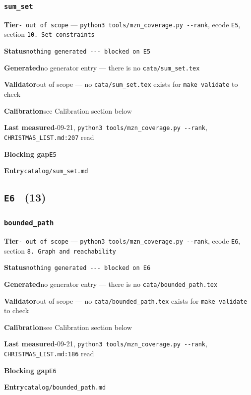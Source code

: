 \documentclass[10pt,a4paper]{article}
\newcommand{\entryfield}[2]{{\raggedright\textbf{#1}\quad #2\par}}
\begin{document}
\subsubsection*{\texttt{sum\_\allowbreak{}set}}
\label{entry:sum-set}
\entryfield{Tier}{\texttt{- out of scope} --- \texttt{python3 tools/\allowbreak{}mzn\_\allowbreak{}coverage.\allowbreak{}py -\allowbreak{}-\allowbreak{}rank}, ecode \texttt{E5}, section \texttt{10. Set constraints}}
\entryfield{Status}{\texttt{nothing generated -\allowbreak{}-\allowbreak{}-\allowbreak{} blocked on E5}}
\entryfield{Generated}{no generator entry --- there is no \texttt{cata/sum\_set.tex}}
\entryfield{Validator}{out of scope --- no \texttt{cata/sum\_set.tex} exists for \texttt{make validate} to check}
\entryfield{Calibration}{see Calibration section below}
\entryfield{Last measured}{2026-09-21, \texttt{python3 tools/\allowbreak{}mzn\_\allowbreak{}coverage.\allowbreak{}py -\allowbreak{}-\allowbreak{}rank}, \texttt{CHRISTMAS\_LIST.md:207} read}
\entryfield{Blocking gap}{\texttt{E5}}
\entryfield{Entry}{\texttt{catalog/sum\_set.md}}
\subsection*{\texttt{E6} \ \normalsize(13)}
\subsubsection*{\texttt{bounded\_\allowbreak{}path}}
\label{entry:bounded-path}
\entryfield{Tier}{\texttt{- out of scope} --- \texttt{python3 tools/\allowbreak{}mzn\_\allowbreak{}coverage.\allowbreak{}py -\allowbreak{}-\allowbreak{}rank}, ecode \texttt{E6}, section \texttt{8.\allowbreak{} Graph and reachability}}
\entryfield{Status}{\texttt{nothing generated -\allowbreak{}-\allowbreak{}-\allowbreak{} blocked on E6}}
\entryfield{Generated}{no generator entry --- there is no \texttt{cata/bounded\_path.tex}}
\entryfield{Validator}{out of scope --- no \texttt{cata/bounded\_path.tex} exists for \texttt{make validate} to check}
\entryfield{Calibration}{see Calibration section below}
\entryfield{Last measured}{2026-09-21, \texttt{python3 tools/\allowbreak{}mzn\_\allowbreak{}coverage.\allowbreak{}py -\allowbreak{}-\allowbreak{}rank}, \texttt{CHRISTMAS\_LIST.md:186} read}
\entryfield{Blocking gap}{\texttt{E6}}
\entryfield{Entry}{\texttt{catalog/bounded\_path.md}}
\end{document}
